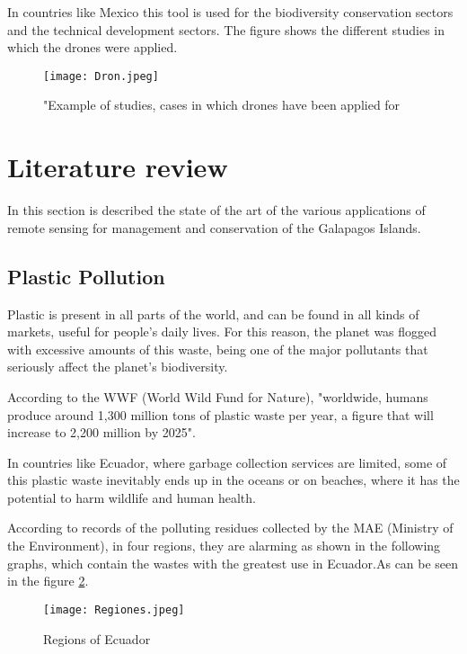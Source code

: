 \documentclass[10pt,english, openany]{book}
\begin{document}
In countries like Mexico this tool is used for the biodiversity conservation sectors and the technical development sectors. The figure shows the different studies in which the drones were applied.

\begin{figure}[h!]
    \centering
    \texttt{[image: Dron.jpeg]}
    \caption{"Example of studies, cases in which drones have been applied for \cite{Productividad2017} }
    \label{fig11:spect}
\end{figure}

\section{Literature review}

In this section  is described the state of the art of the various applications of remote sensing for management and conservation of the Galapagos Islands.

\subsection{Plastic Pollution}

Plastic is present in all parts of the world, and can be found in all kinds of markets, useful for people's daily lives. For this reason, the planet was flogged with excessive amounts of this waste, being one of the major pollutants that seriously affect the planet's biodiversity.

According to the WWF (World Wild Fund for Nature), "worldwide, humans produce around 1,300 million tons of plastic waste per year, a figure that will increase to 2,200 million by 2025". \cite{WWF}

In countries like Ecuador, where garbage collection services are limited, some of this plastic waste inevitably ends up in the oceans or on beaches, where it has the potential to harm wildlife and human health.

According to records of the polluting residues collected by the MAE (Ministry of the Environment), in four regions, they are alarming as shown in the following graphs, which contain the wastes with the greatest use in Ecuador.As can be seen in the figure \ref{fig1:spect}.

\vspace{1cm}

\begin{figure}[h!]
    \centering
    \texttt{[image: Regiones.jpeg]}
    \caption{Regions of Ecuador \cite{Infograma} }
    \label{fig1:spect}
\end{figure}
    
\end{document}
